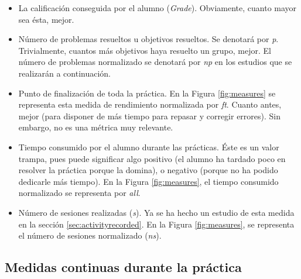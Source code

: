 \begin{itemize}
\item La calificación conseguida por el alumno (\emph{Grade}). Obviamente, cuanto mayor sea ésta, mejor.
\item Número de problemas resueltos u objetivos resueltos. Se denotará por \emph{p}. Trivialmente, cuantos más objetivos haya resuelto un grupo, mejor. El número de problemas normalizado se denotará por \emph{np} en los estudios que se realizarán a continuación.
\item Punto de finalización de toda la práctica. En la Figura \ref{fig:measures}  se representa esta medida de rendimiento normalizada por \emph{ft}. Cuanto antes, mejor (para disponer de más tiempo para repasar y corregir errores). Sin embargo, no es una métrica muy relevante.
\item Tiempo consumido por el alumno durante las prácticas. Éste es un valor trampa, pues puede significar algo positivo (el alumno ha tardado poco en resolver la práctica porque la domina), o negativo (porque no ha podido dedicarle más tiempo). En la Figura \ref{fig:measures}, el tiempo consumido normalizado se representa por \emph{all}.
\item Número de sesiones realizadas (\emph{s}). Ya se ha hecho un estudio de esta medida en la sección \ref{sec:activityrecorded}. En la Figura \ref{fig:measures}, se representa el número de sesiones normalizado (\emph{ns}).
\end{itemize}

\subsection{Medidas continuas durante la práctica}

